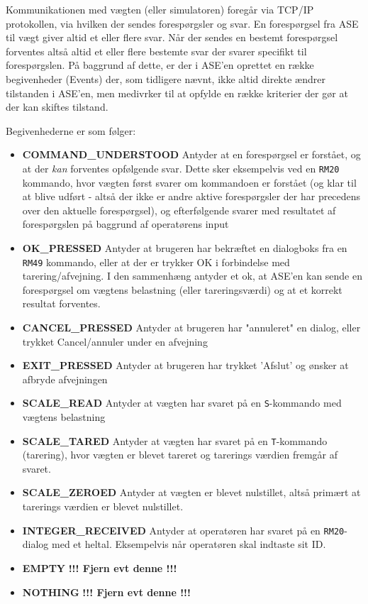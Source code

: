 \documentclass[a4paper]{article}
\begin{document}
Kommunikationen med vægten (eller simulatoren) foregår via TCP/IP protokollen, via hvilken der sendes forespørgsler og svar. En forespørgsel fra ASE til vægt giver altid et eller flere svar. Når der sendes en bestemt forespørgsel forventes altså altid et eller flere bestemte svar der svarer specifikt til forespørgslen. På baggrund af dette, er der i ASE'en oprettet en række begivenheder (Events) der, som tidligere nævnt, ikke altid direkte ændrer tilstanden i ASE'en, men medivrker til at opfylde en række kriterier der gør at der kan skiftes tilstand.

Begivenhederne er som følger:

\begin{itemize}
  \item \textbf{COMMAND\_UNDERSTOOD} Antyder at en forespørgsel er forstået, og at der \emph{kan} forventes opfølgende svar. Dette sker eksempelvis ved en \texttt{RM20} kommando, hvor vægten først svarer om kommandoen er forstået (og klar til at blive udført - altså der ikke er andre aktive forespørgsler der har precedens over den aktuelle forespørgsel), og efterfølgende svarer med resultatet af forespørgslen på baggrund af operatørens input
  \item \textbf{OK\_PRESSED} Antyder at brugeren har bekræftet en dialogboks fra en \texttt{RM49} kommando, eller at der er trykker OK i forbindelse med tarering/afvejning. I den sammenhæng antyder et ok, at ASE'en kan sende en forespørgsel om vægtens belastning (eller tareringsværdi) og at et korrekt resultat forventes.
  \item \textbf{CANCEL\_PRESSED} Antyder at brugeren har "annuleret" en dialog, eller trykket Cancel/annuler under en afvejning
  \item \textbf{EXIT\_PRESSED} Antyder at brugeren har trykket 'Afslut' og ønsker at afbryde afvejningen
  \item \textbf{SCALE\_READ} Antyder at vægten har svaret på en \texttt{S}-kommando med vægtens belastning
  \item \textbf{SCALE\_TARED} Antyder at vægten har svaret på en \texttt{T}-kommando (tarering), hvor vægten er blevet tareret og tarerings værdien fremgår af svaret.
  \item \textbf{SCALE\_ZEROED} Antyder at vægten er blevet nulstillet, altså primært at tarerings værdien er blevet nulstillet.
  \item \textbf{INTEGER\_RECEIVED} Antyder at operatøren har svaret på en \texttt{RM20}-dialog med et heltal. Eksempelvis når operatøren skal indtaste sit ID.
  \item \textbf{EMPTY} \textbf{!!! Fjern evt denne !!!}
  \item \textbf{NOTHING} \textbf{!!! Fjern evt denne !!!}
\end{itemize}
\end{document}
